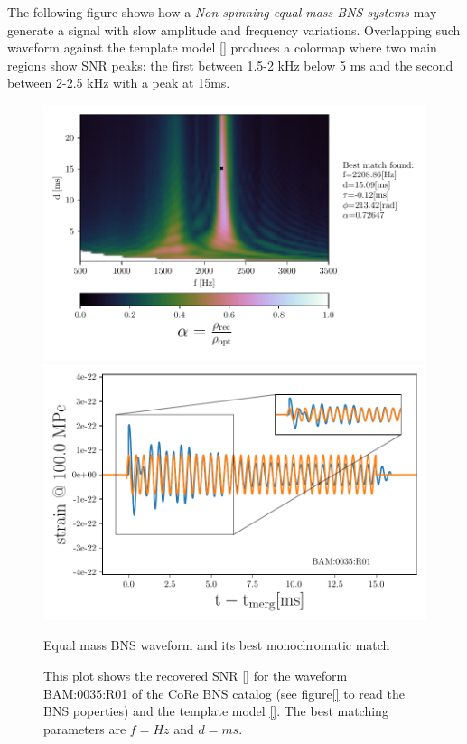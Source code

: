 The following figure shows how a \textit{Non-spinning equal mass BNS systems} may generate a signal with slow amplitude and frequency variations. Overlapping such waveform against the template model \ref{} produces a colormap where two main regions show SNR peaks: the first between 1.5-2 kHz below 5 ms and the second between 2-2.5 kHz with a peak at 15ms. 

\begin{figure}[!htbp]
\begin{center}
\begin{minipage}[t]{0.5\linewidth}
\vspace{0pt}
\includegraphics[scale=0.6,trim={2mm 0 35mm 0},clip]{images/Data_analysis/results/2D_grid_1.pdf}
\end{minipage}%
\begin{minipage}[t]{0.5\linewidth}
\vspace{20pt}
\includegraphics[scale=0.45]{images/Data_analysis/results/2D_grid_2.pdf}
\end{minipage}
\captionsetup{width=0.8\textwidth}
\caption{Equal mass BNS waveform and its best monochromatic match}
\caption*{This plot shows the recovered SNR \ref{} for the waveform BAM:0035:R01 of the CoRe BNS catalog \cite{}(see figure\ref{} to read the BNS poperties) and the template model \ref{}. The best matching parameters are $f=Hz$ and $d=ms$.}
\end{center}
\end{figure}

